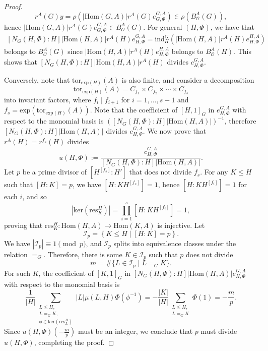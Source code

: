\documentclass[letterpaper,12pt]{article}
\theoremstyle{plain}
\theoremstyle{definition}
\newcommand{\BAOG}{B^A_{\mathcal{O}}(G)}
\newcommand{\eGAGPhi}{e^{G,A}_{G,\Phi}}
\newcommand{\eGAHPhi}{e^{G,A}_{H,\Phi}}
\newcommand{\cGAHPhi}{c^{G,A}_{H,\Phi}}
\begin{document}
\begin{proof}
    $$r^A(G)y=\rho\left(\left|\mathrm{Hom}(G,A)\right|r^A(G)\eGAGPhi\right) \in \rho\left(\BAOG\right),$$
    hence $\left|\mathrm{Hom}(G,A)\right|r^A(G)\eGAGPhi \in \BAOG$. For general $(H,\Phi)$, we have that
    \begin{align*}
        \left[N_G(H,\Phi):H\right]\left|\mathrm{Hom}(H,A)\right| r^A(H) e^{G,A}_{H,\Phi} = \mathrm{ind}^G_H\left(\left|\mathrm{Hom}(H,A)\right|r^A(H)e^{H,A}_{H,\Phi}\right) 
    \end{align*}
    belongs to $\BAOG$ since $\left|\mathrm{Hom}(H,A)\right|r^A(H)e^{H,A}_{H,\Phi}$ belongs to $B^A_{\mathcal{O}}(H)$. This shows that $\left[N_G(H,\Phi):H\right]\left|\mathrm{Hom}(H,A)\right|r^A(H)$ divides $\cGAHPhi$.

    Conversely, note that $\mathrm{tor}_{\mathrm{exp}(H)}(A)$ is also finite, and consider a decomposition
    $$\mathrm{tor}_{\mathrm{exp}(H)}(A)=C_{f_1} \times C_{f_2}\times \cdots \times C_{f_s}$$ 
    into invariant factors, where $f_i\mid f_{i+1}$ for $i=1,...,s-1$ and $f_s=\mathrm{exp}\left(\mathrm{tor}_{\mathrm{exp}(H)}(A)\right)$. Note that the coefficient of $[H,1]_G$ in $\eGAHPhi$ with respect to the monomial basis is $\left([N_G(H,\Phi):H]|\mathrm{Hom}(H,A)|\right)^{-1}$, therefore $[N_G(H,\Phi):H]|\mathrm{Hom}(H,A)|$ divides $\cGAHPhi$. We now prove that $r^A(H)=r^{f_s}(H)$ divides 
    $$u(H,\Phi):=\frac{\cGAHPhi}{\left[N_G(H,\Phi):H\right]\left|\mathrm{Hom}(H,A)\right|}.$$ 
    Let $p$ be a prime divisor of $\left[H^{[f_s]}:H'\right]$ that does not divide $f_s$. For any $K\leq H$ such that $[H:K]=p$, we have $\left[H:KH^{[f_s]}\right]=1$, hence $\left[H:KH^{[f_i]}\right]=1$ for each $i$, and so
    $$\left|\mathrm{ker}\left(\mathrm{res}^H_K\right)\right|=\prod_{i=1}^s\left[H:KH^{[f_i]}\right]=1,$$
    proving that $\mathrm{res}^H_K:\mathrm{Hom}(H,A)\to \mathrm{Hom}(K,A)$ is injective. Let 
    $$\mathcal{I}_p=\left\{K\leq H \mid [H:K]=p\right\}.$$ 
    We have $\left|\mathcal{I}_p\right|\equiv 1 \pmod{p}$, and $\mathcal{I}_p$ splits into equivalence classes under the relation $=_G$. Therefore, there is some $K\in \mathcal{I}_p$ such that $p$ does not divide 
    $$m=\# \{L\in \mathcal{I}_p \mid L=_GK\}.$$
    For such $K$, the coefficient of $[K,1]_G$ in $\left[N_G(H,\Phi):H\right]\left|\mathrm{Hom}(H,A)\right|\eGAHPhi$ with respect to the monomial basis is
    $$\frac{1}{|H|}\sum_{\substack{
    L\leq H,\\
    L=_GK,\\
    \phi\in \mathrm{ker}\left(\mathrm{res}^H_L\right)
    }
    }|L|\mu(L,H)\Phi\left(\phi^{-1}\right)=-\frac{|K|}{|H|}\sum_{\substack{
        L\leq H,\\
        L=_GK}
        }\Phi(1)=-\frac{m}{p}.$$
    Since $u(H,\Phi)\left(-\frac{m}{p}\right)$ must be an integer, we conclude that $p$ must divide $u(H,\Phi)$, completing the proof.
\end{proof}
\end{document}
